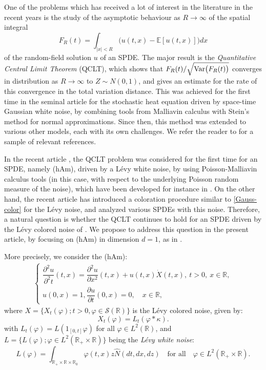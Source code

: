 \documentclass[12pt]{article}
\def\cS{\mathcal{S}}
\def\bE{\mathbb{E}}
\def\bR{\mathbb{R}}
\def\k{\kappa}
\begin{document}
\medskip

One of the problems which has received a lot of interest in the literature in the recent years is the study of the asymptotic behaviour as $R \to \infty$ of the spatial integral 
\[
F_R(t)=\int_{|x|<R} \big(u(t,x)-\bE[u(t,x)]\big)dx
\]
of the random-field solution $u$ of an SPDE. The major result is the {\em Quantitative Central Limit Theorem} (QCLT), which shows that $F_R(t)/\sqrt{{\rm Var}\big(F_R(t)\big)}$ converges in distribution as $R \to \infty$ to $Z \sim N(0,1)$, and gives an estimate for the rate of this convergence in the total variation distance. This was achieved for the first time in the seminal article \cite{HNV20} for the stochastic heat equation driven by space-time Gaussian white noise, by combining tools from Malliavin calculus with Stein's method for normal approximations. Since then, this method was extended to various other models, each with its own challenges. We refer the reader to \cite{BNZ,CKNP-delta,CKNP22,DNZ20,HNVZ,NSZ20,NXZ22,NZ20-1,NZ20-2,NZ22} for a sample of relevant references.

\medskip

In the recent article \cite{BZ24}, the QCLT problem was considered for the first time for an SPDE, namely (hAm),
driven by a L\'evy white noise, by using Poisson-Malliavin calculus tools (in this case, with respect to the underlying Poisson random measure of the noise), which have been developed for instance in \cite{Last16,LPS16}.  On the other hand, the recent article \cite{BJ25} has introduced a coloration procedure similar to \eqref{Gauss-color} for the L\'evy noise, and analyzed various SPDEs with this noise. Therefore, a natural question is whether the QCLT continues to hold for an SPDE driven by the L\'evy colored noise of \cite{BJ25}. We propose to address this question in the present article, by focusing on (hAm) in dimension $d=1$, as in \cite{BZ24}.

\medskip

More precisely, we consider the (hAm): 
\begin{align}
\label{HAM}
	\begin{cases}
		\dfrac{\partial^2 u}{\partial^2 t} (t,x)
		=  \dfrac{\partial^2 u}{\partial x^2} (t,x)+u(t,x) \dot{X}(t,x), \
		t>0, \ x \in \bR, \\
		u(0,x) = 1, \dfrac{\partial u}{\partial t} (0,x)=0, \quad x \in \bR,
	\end{cases}
\end{align}
where $X=\{X_t(\varphi);t>0,\varphi \in \cS(\bR)\}$ is the L\'evy colored noise, given by:
\[
X_t(\varphi)=L_t(\varphi *\k).
\]
with $L_t(\varphi)=L(1_{[0,t]} \varphi)$ for all $\varphi \in L^2(\bR)$, and $L=\{L(\varphi);\varphi \in L^2(\bR_{+} \times \bR)\}$ being the {\em L\'evy white noise}:
\[
L(\varphi)=\int_{\bR_{+} \times \bR \times \bR_0} \varphi(t,x)z \widehat{N}(dt,dx,dz) \quad \mbox{for all} \quad \varphi \in L^2(\bR_{+} \times \bR).
\]
\end{document}
